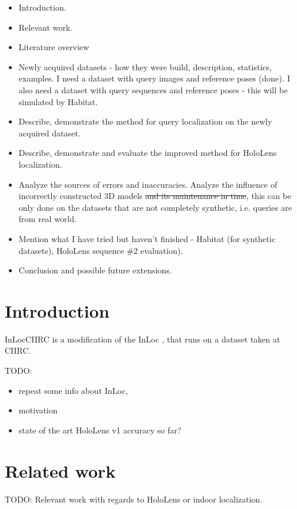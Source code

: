 \documentclass[twoside]{ctuthesis}
\theoremstyle{plain}
\theoremstyle{definition}
\theoremstyle{note}
\begin{document}
\begin{itemize}
	\item Introduction.
	\item Relevant work.
	\item Literature overview
	\item Newly acquired datasets - how they were build, description, statistics, examples. I need a dataset with query images and reference poses (done). I also need a dataset with query sequences and reference poses - this will be simulated by Habitat.
	\item Describe, demonstrate the method for query localization on the newly acquired dataset.
	\item Describe, demonstrate and evaluate the improved method for HoloLens localization.
	\item Analyze the sources of errors and inaccuracies. Analyze the influence of incorrectly constructed 3D models \sout{and its maintenance in time}, this can be only done on the datasets that are not completely synthetic, i.e. queries are from real world.
	\item Mention what I have tried but haven't finished - Habitat (for synthetic datasets), HoloLens sequence \#2 evaluation).
	\item Conclusion and possible future extensions.
\end{itemize}


\chapter{Introduction}
InLocCIIRC is a modification of the InLoc \cite{taira2018inloc}, that runs on a dataset taken at CIIRC.

TODO:
\begin{itemize}
	\item repeat some info about InLoc,
	\item motivation
	\item state of the art HoloLens v1 accuracy so far?
\end{itemize}

\chapter{Related work}
TODO: Relevant work with regards to HoloLens or indoor localization.
\end{document}
